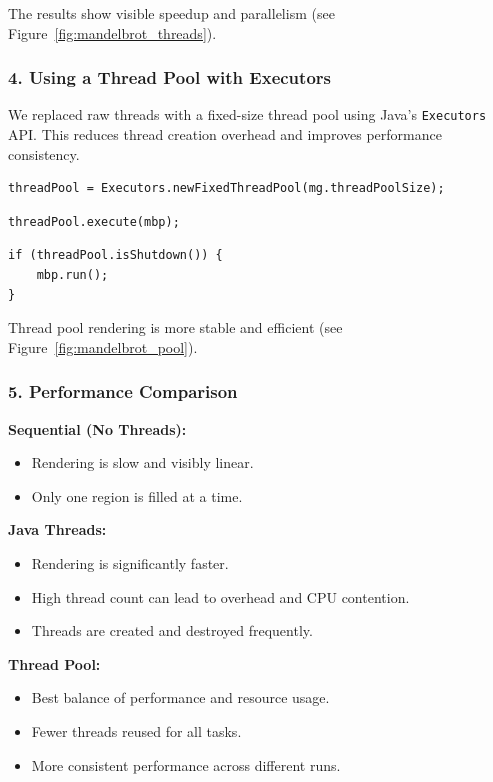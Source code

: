 \documentclass[a4paper,12pt]{article}
\begin{document}
The results show visible speedup and parallelism (see Figure~\ref{fig:mandelbrot_threads}).

\subsubsection*{4. Using a Thread Pool with Executors}

We replaced raw threads with a fixed-size thread pool using Java's \texttt{Executors} API. This reduces thread creation overhead and improves performance consistency.

\begin{lstlisting}[caption=Creating the thread pool]
threadPool = Executors.newFixedThreadPool(mg.threadPoolSize);
\end{lstlisting}

\begin{lstlisting}[caption=Submitting tasks to the thread pool]
threadPool.execute(mbp);
\end{lstlisting}

\begin{lstlisting}[caption=Fallback in case of pool shutdown]
if (threadPool.isShutdown()) {
    mbp.run();
}
\end{lstlisting}

Thread pool rendering is more stable and efficient (see Figure~\ref{fig:mandelbrot_pool}).

\subsubsection*{5. Performance Comparison}

\textbf{Sequential (No Threads):}
\begin{itemize}
  \item Rendering is slow and visibly linear.
  \item Only one region is filled at a time.
\end{itemize}

\textbf{Java Threads:}
\begin{itemize}
  \item Rendering is significantly faster.
  \item High thread count can lead to overhead and CPU contention.
  \item Threads are created and destroyed frequently.
\end{itemize}

\textbf{Thread Pool:}
\begin{itemize}
  \item Best balance of performance and resource usage.
  \item Fewer threads reused for all tasks.
  \item More consistent performance across different runs.
\end{itemize}
\end{document}
